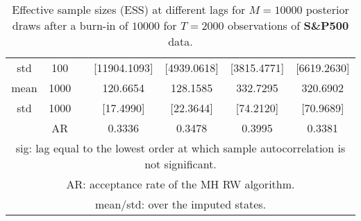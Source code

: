 {\begin{table}
\begin{tabular}{ccc cc cc}
std & 100 &  & [11904.1093]  & [4939.0618]  & [3815.4771]  & [6619.2630]  \\  [1ex]
mean & 1000 &  & 120.6654  & 128.1585  & 332.7295  & 320.6902  \\ 
std & 1000 &  & [17.4990]  & [22.3644]  & [74.2120]  & [70.9689]  \\  [1ex]
 & AR &  & 0.3336  & 0.3478  & 0.3995  & 0.3381  \\  [1ex]
\hline 
\multicolumn{7}{p{11cm}}{\footnotesize{sig: lag equal to the lowest order at which sample autocorrelation is not significant.}}  \\ 
\multicolumn{7}{p{11cm}}{\footnotesize{AR: acceptance rate of the MH RW algorithm.}}  \\ 
\multicolumn{7}{p{11cm}}{\footnotesize{mean/std: over the imputed states.}}  \\ 
\end{tabular}
 \caption{Effective sample sizes (ESS) at different lags  for $M=10000$ posterior draws after a burn-in of $10000$ for $T=2000$ observations of \textbf{S\&P500} data.}
\label{tab:ESS_GSPC}  
\end{table}
}